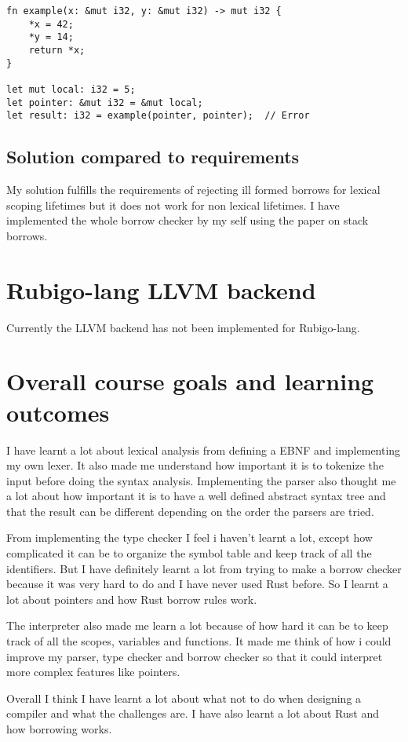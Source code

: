 \documentclass[12pt]{article}
\begin{document}
    	\begin{verbatim}
fn example(x: &mut i32, y: &mut i32) -> mut i32 {
    *x = 42;
    *y = 14;
    return *x;
}

let mut local: i32 = 5;
let pointer: &mut i32 = &mut local;
let result: i32 = example(pointer, pointer);  // Error
    	\end{verbatim}


	\subsection{Solution compared to requirements}
	My solution fulfills the requirements of rejecting ill formed borrows for lexical scoping lifetimes but it does not work for non lexical lifetimes. I have implemented the whole borrow checker by my self using the paper on stack borrows.


    \section{Rubigo-lang LLVM backend}	
    	Currently the LLVM backend has not been implemented for Rubigo-lang.
	


    \section{Overall course goals and learning outcomes}
	I have learnt a lot about lexical analysis from defining a EBNF and implementing my own lexer.	It also made me understand how important it is to tokenize the input before doing the syntax analysis. Implementing the parser also thought me a lot about how important it is to have a well defined abstract syntax tree and that the result can be different depending on the order the parsers are tried.

	From implementing the type checker I feel i haven't learnt a lot, except how complicated it can be to organize the symbol table and keep track of all the identifiers. But I have definitely learnt a lot from trying to make a borrow checker because it was very hard to do and I have never used Rust before. So I learnt a lot about pointers and how Rust borrow rules work.

	The interpreter also made me learn a lot because of how hard it can be to keep track of all the scopes, variables and functions. It made me think of how i could improve my parser, type checker and borrow checker so that it could interpret more complex features like pointers.

	Overall I think I have learnt a lot about what not to do when designing a compiler and what the challenges are. I have also learnt a lot about Rust and how borrowing works.
\end{document}
